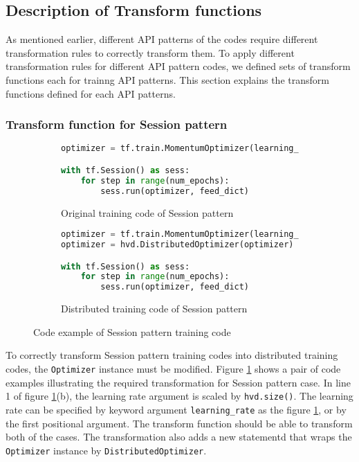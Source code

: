 \subsection{Description of Transform functions}

As mentioned earlier, different API patterns of the codes
require different transformation rules to correctly transform them.
To apply different transformation rules for different API pattern codes,
we defined sets of transform functions each for trainng API patterns.
This section explains the transform functions defined for each API patterns.

\subsubsection{Transform function for Session pattern}

\begin{figure}[ht!]
  \begin{subfigure}[t]{0.45\textwidth}
    \begin{lstlisting}[language=Python]
optimizer = tf.train.MomentumOptimizer(learning_rate = 0.01)

with tf.Session() as sess:
    for step in range(num_epochs): 
        sess.run(optimizer, feed_dict)
    \end{lstlisting}
    \caption{Original training code of Session pattern}
  \end{subfigure}
  \hspace{5mm}
  \begin{subfigure}[t]{0.45\textwidth}
    \begin{lstlisting}[language=Python]
optimizer = tf.train.MomentumOptimizer(learning_rate = 0.01 * hvd.size())
optimizer = hvd.DistributedOptimizer(optimizer)

with tf.Session() as sess:
    for step in range(num_epochs): 
        sess.run(optimizer, feed_dict)
    \end{lstlisting}
    \caption{Distributed training code of Session pattern}
  \end{subfigure}
  \caption{Code example of Session pattern training code}
  \label{fig:trans:sessiontrans}
\end{figure}

To correctly transform Session pattern training codes into distributed 
training codes, the {\tt Optimizer} instance must be modified.
Figure \ref{fig:trans:sessiontrans} shows a pair of code examples
illustrating the required transformation for Session pattern case.
In line 1 of figure \ref{fig:trans:sessiontrans}(b),
the learning rate argument is scaled by {\tt hvd.size()}.
The learning rate can be specified by keyword argument {\tt learning\_rate}
as the figure \ref{fig:trans:sessiontrans},
or by the first positional argument.
The transform function should be able to transform both of the cases.
The transformation also adds a new statementd that wraps the 
{\tt Optimizer} instance by {\tt DistributedOptimizer}.

